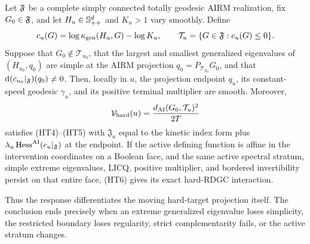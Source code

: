 \begin{corollary}
\label{cor:hard-condition-response}
Let \(\mathfrak F\) be a complete simply connected totally geodesic AIRM
realization, fix \(G_0\in\mathfrak F\), and let \(H_u\in\mathbb S_{++}^d\) and \(K_u>1\) vary
smoothly.  Define
\[
  c_u(G)=\log\kappa_{\rm gen}(H_u,G)-\log K_u,
  \qquad
  \mathcal T_u=\{G\in\mathfrak F:c_u(G)\le0\}.
\]
Suppose that \(G_0\notin\mathcal T_{u_0}\), that the largest and smallest
generalized eigenvalues of \((H_{u_0},q_0)\) are simple at the AIRM projection
\(q_0=P_{\mathcal T_{u_0}}G_0\), and that
\(\mathrm d(c_{u_0}|_{\mathfrak F})(q_0)\ne0\).  Then, locally in \(u\), the projection
endpoint \(q_u\), its constant-speed geodesic \(\gamma_u\), and its positive
terminal multiplier are smooth.  Moreover,
\[
  \mathcal V_{\rm hard}(u)
  =\frac{d_{\mathrm{AI}}(G_0,\mathcal T_u)^2}{2T}
\]
satisfies \textup{(HT4)}--\textup{(HT5)} with
\(\mathfrak J_u\) equal to the kinetic index form plus
\(\lambda_u\operatorname{Hess}^{\mathrm{AI}}(c_u|_{\mathfrak F})\) at the endpoint.
If the active defining function is affine in the intervention coordinates on
a Boolean face, and the same active spectral stratum, simple extreme
eigenvalues, LICQ, positive multiplier, and bordered invertibility persist on
that entire face, \textup{(HT6)} gives its exact hard-RDGC interaction.

Thus the response differentiates the moving hard-target projection itself.
The conclusion ends precisely when an extreme generalized eigenvalue loses
simplicity, the restricted boundary loses regularity, strict complementarity
fails, or the active stratum changes.
\end{corollary}

